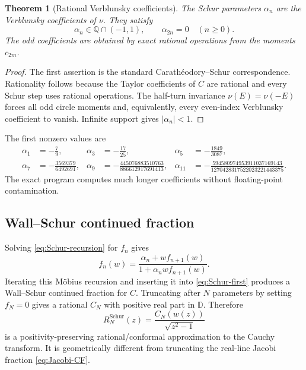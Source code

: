 \documentclass[11pt,oneside]{article}
\newtheorem{theorem}{Theorem}[section]
\theoremstyle{definition}
\newcommand{\D}{\mathbb D}
\begin{document}
\begin{theorem}[Rational Verblunsky coefficients]
\label{thm:rational-alpha}
The Schur parameters \(\alpha_n\) are the Verblunsky coefficients of \(\nu\). They satisfy
\begin{equation}
 \alpha_n\in\mathbb Q\cap(-1,1),\qquad \alpha_{2n}=0\quad(n\ge0).
 \label{eq:alpha-rational-parity}
\end{equation}
The odd coefficients are obtained by exact rational operations from the moments \(c_{2m}\).
\end{theorem}

\begin{proof}
The first assertion is the standard Carath\'eodory--Schur correspondence. Rationality follows
because the Taylor coefficients of \(C\) are rational and every Schur step uses rational
operations. The half-turn invariance \(\nu(E)=\nu(-E)\) forces all odd circle moments and,
equivalently, every even-index Verblunsky coefficient to vanish. Infinite support gives
\(|\alpha_n|<1\).
\end{proof}

The first nonzero values are
\begin{align*}
 \alpha_1&=-\frac79,&
 \alpha_3&=-\frac{17}{25},&
 \alpha_5&=-\frac{1849}{3087},\\
 \alpha_7&=-\frac{3569379}{6492691},&
 \alpha_9&=-\frac{445076883510763}{886612917691413},&
 \alpha_{11}&=-\frac{594580974953911037169143}{1270428317522023221443375}.
\end{align*}
The exact program computes much longer coefficients without floating-point contamination.

\subsection{Wall--Schur continued fraction}

Solving \eqref{eq:Schur-recursion} for \(f_n\) gives
\begin{equation}
 f_n(w)=\frac{\alpha_n+w f_{n+1}(w)}{1+\alpha_n w f_{n+1}(w)}.
 \label{eq:inverse-Schur-step}
\end{equation}
Iterating this Möbius recursion and inserting it into \eqref{eq:Schur-first} produces a
Wall--Schur continued fraction for \(C\). Truncating after \(N\) parameters by setting
\(f_N=0\) gives a rational \(C_N\) with positive real part in \(\D\). Therefore
\begin{equation}
 R_N^{\mathrm{Schur}}(z)=\frac{C_N(w(z))}{\sqrt{z^2-1}}
 \label{eq:R-Schur-approximant}
\end{equation}
is a positivity-preserving rational/conformal approximation to the Cauchy transform. It is
geometrically different from truncating the real-line Jacobi fraction
\eqref{eq:Jacobi-CF}.
\end{document}
